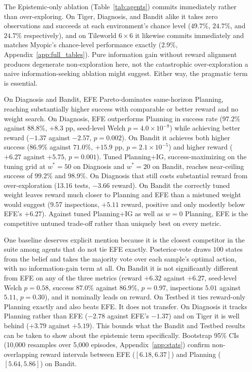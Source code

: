The Epistemic-only ablation (Table~\ref{tab:agents}) commits immediately rather than over-exploring. On Tiger, Diagnosis, and Bandit alike it takes zero observations and succeeds at each environment's chance level ($49.7\%$, $24.7\%$, and $24.7\%$ respectively), and on Tileworld $6{\times}6$ it likewise commits immediately and matches Myopic's chance-level performance exactly ($2.9\%$, Appendix~\ref{app:full_tables}). Pure information gain without reward alignment produces degenerate non-exploration here, not the catastrophic over-exploration a naive information-seeking ablation might suggest. Either way, the pragmatic term is essential.

On Diagnosis and Bandit, EFE Pareto-dominates same-horizon Planning, reaching substantially higher success with comparable or better reward and no weight search. On Diagnosis, EFE outperforms Planning in success rate ($97.2\%$ against $88.8\%$, $+8.3$ pp, seed-level Welch $p{=}4.0{\times}10^{-8}$) while achieving better reward ($-1.37$ against $-2.57$, $p{=}0.002$). On Bandit it achieves both higher success ($86.9\%$ against $71.0\%$, $+15.9$ pp, $p{=}2.1{\times}10^{-5}$) and higher reward ($+6.27$ against $+5.75$, $p{=}0.001$). Tuned Planning+IG, success-maximizing on the tuning grid at $w^*{=}50$ on Diagnosis and $w^*{=}20$ on Bandit, reaches near-ceiling success of $99.2\%$ and $98.9\%$. On Diagnosis that still costs substantial reward from over-exploration (13.16 tests, $-3.66$ reward). On Bandit the correctly tuned weight leaves reward much closer to Planning and EFE than a mistuned weight would suggest (9.57 inspections, $+5.11$ reward, positive and only modestly below EFE's $+6.27$). Against tuned Planning+IG as well as $w{=}0$ Planning, EFE is the competitive untuned trade-off rather than uniquely best on every metric.

One baseline deserves explicit mention because it is the closest competitor in the suite among agents that do not tie EFE exactly. Posterior-vote draws $100$ states from the belief and takes the majority vote over each sample's optimal action, with no information-gain term at all. On Bandit it is not significantly different from EFE on any of the three metrics (reward $+6.32$ against $+6.27$, seed-level Welch $p{=}0.58$, success $87.0\%$ against $86.9\%$, $p{=}0.97$, inspections $5.01$ against $5.11$, $p{=}0.30$), and it nominally leads on reward. On Testbed it ties reward-only Planning exactly and also beats EFE. It does not transfer. On Diagnosis it tracks Planning rather than EFE ($-2.78$ against EFE's $-1.37$) and on Tiger it is well behind ($+3.79$ against $+5.19$). This bounds what the Bandit and Testbed results can be taken to show about the epistemic term specifically. Bootstrap 95\% CIs (10{,}000 resamples over 5{,}000 episodes, Appendix~\ref{app:stats}) confirm non-overlapping reward intervals between EFE ($[6.18, 6.37]$) and Planning ($[5.64, 5.86]$) on Bandit.

